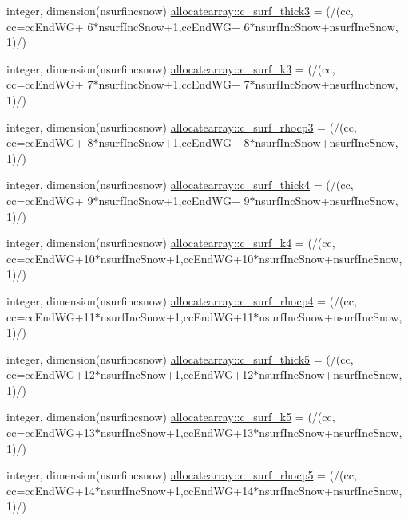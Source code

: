 \begin{DoxyCompactItemize}
\item 
integer, dimension(nsurfincsnow) \hyperlink{namespaceallocatearray_a6e64c0458fe3780a6b81c02c9c18c87f}{allocatearray\+::c\+\_\+surf\+\_\+thick3} = (/(cc, cc=cc\+End\+WG+ 6$\ast$nsurf\+Inc\+Snow+1,cc\+End\+WG+ 6$\ast$nsurf\+Inc\+Snow+nsurf\+Inc\+Snow, 1)/)
\item 
integer, dimension(nsurfincsnow) \hyperlink{namespaceallocatearray_abd4d53cdda7a49efd6e747ac3c599869}{allocatearray\+::c\+\_\+surf\+\_\+k3} = (/(cc, cc=cc\+End\+WG+ 7$\ast$nsurf\+Inc\+Snow+1,cc\+End\+WG+ 7$\ast$nsurf\+Inc\+Snow+nsurf\+Inc\+Snow, 1)/)
\item 
integer, dimension(nsurfincsnow) \hyperlink{namespaceallocatearray_aa72f745011098db1badf39ab33cea273}{allocatearray\+::c\+\_\+surf\+\_\+rhocp3} = (/(cc, cc=cc\+End\+WG+ 8$\ast$nsurf\+Inc\+Snow+1,cc\+End\+WG+ 8$\ast$nsurf\+Inc\+Snow+nsurf\+Inc\+Snow, 1)/)
\item 
integer, dimension(nsurfincsnow) \hyperlink{namespaceallocatearray_a1d34ddb04c02fc201a2a1f467ab5afe0}{allocatearray\+::c\+\_\+surf\+\_\+thick4} = (/(cc, cc=cc\+End\+WG+ 9$\ast$nsurf\+Inc\+Snow+1,cc\+End\+WG+ 9$\ast$nsurf\+Inc\+Snow+nsurf\+Inc\+Snow, 1)/)
\item 
integer, dimension(nsurfincsnow) \hyperlink{namespaceallocatearray_ad37f821b9c923544adca4561e173b0ec}{allocatearray\+::c\+\_\+surf\+\_\+k4} = (/(cc, cc=cc\+End\+WG+10$\ast$nsurf\+Inc\+Snow+1,cc\+End\+WG+10$\ast$nsurf\+Inc\+Snow+nsurf\+Inc\+Snow, 1)/)
\item 
integer, dimension(nsurfincsnow) \hyperlink{namespaceallocatearray_aeb83627142153ed809b4e704bd02f508}{allocatearray\+::c\+\_\+surf\+\_\+rhocp4} = (/(cc, cc=cc\+End\+WG+11$\ast$nsurf\+Inc\+Snow+1,cc\+End\+WG+11$\ast$nsurf\+Inc\+Snow+nsurf\+Inc\+Snow, 1)/)
\item 
integer, dimension(nsurfincsnow) \hyperlink{namespaceallocatearray_a0c826a9f4443bc7d56a37347a79fd81d}{allocatearray\+::c\+\_\+surf\+\_\+thick5} = (/(cc, cc=cc\+End\+WG+12$\ast$nsurf\+Inc\+Snow+1,cc\+End\+WG+12$\ast$nsurf\+Inc\+Snow+nsurf\+Inc\+Snow, 1)/)
\item 
integer, dimension(nsurfincsnow) \hyperlink{namespaceallocatearray_a690e080a92d241ea4f662cecb4f923de}{allocatearray\+::c\+\_\+surf\+\_\+k5} = (/(cc, cc=cc\+End\+WG+13$\ast$nsurf\+Inc\+Snow+1,cc\+End\+WG+13$\ast$nsurf\+Inc\+Snow+nsurf\+Inc\+Snow, 1)/)
\item 
integer, dimension(nsurfincsnow) \hyperlink{namespaceallocatearray_aca21486cca8b4e96b0e6015c03f7a2dc}{allocatearray\+::c\+\_\+surf\+\_\+rhocp5} = (/(cc, cc=cc\+End\+WG+14$\ast$nsurf\+Inc\+Snow+1,cc\+End\+WG+14$\ast$nsurf\+Inc\+Snow+nsurf\+Inc\+Snow, 1)/)

\end{DoxyCompactItemize}
